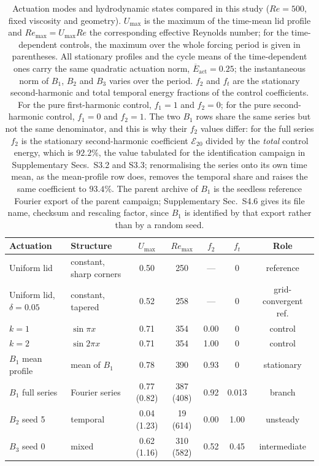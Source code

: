 \documentclass[11pt,a4paper]{article}
\newenvironment{chgadd}{\par\color{blue}}{\par\color{black}}
\begin{document}
\begin{chgadd}
\begin{table}[t]
\centering
\caption{Actuation modes and hydrodynamic states compared in this study
($Re=500$, fixed viscosity and geometry). $U_{\max}$ is the maximum of the
time-mean lid profile and $Re_{\max}=U_{\max}Re$ the corresponding effective
Reynolds number; for the time-dependent controls, the maximum over the whole
forcing period is given in parentheses. All stationary profiles and the cycle means of
the time-dependent ones carry the same quadratic actuation norm,
$\overline{E}_{\mathrm{act}}=0.25$; the instantaneous norm of $B_1$, $B_2$ and $B_3$
varies over the period. $f_2$ and $f_t$ are the stationary second-harmonic and
total temporal energy fractions of the control coefficients. For the pure
first-harmonic control, $f_1=1$ and $f_2=0$; for the pure second-harmonic control,
$f_1=0$ and $f_2=1$. The two $B_1$ rows share the same series but not the same
denominator, and this is why their $f_2$ values differ: for the full series $f_2$ is
the stationary second-harmonic coefficient $\mathcal{E}_{20}$ divided by the
\emph{total} control energy, which is $92.2\%$, the value tabulated for the
identification campaign in Supplementary Secs.~S3.2 and S3.3; renormalising the
series onto its own time mean, as the mean-profile row does, removes the temporal
share and raises the same coefficient to $93.4\%$. The parent archive of $B_1$ is
the seedless reference Fourier export of the parent campaign; Supplementary
Sec.~S4.6 gives its file name, checksum and rescaling factor, since $B_1$ is
identified by that export rather than by a random seed.}
\label{tab:modes}
\footnotesize
\setlength{\tabcolsep}{4pt}
\begin{tabular}{llccccc}
\toprule
Actuation & Structure & $U_{\max}$ & $Re_{\max}$ & $f_2$ & $f_t$ & Role\\
\midrule
Uniform lid & constant, sharp corners & 0.50 & 250 & --- & 0 & reference\\
Uniform lid, $\delta=0.05$ & constant, tapered & 0.52 & 258 & --- & 0 & grid-convergent ref.\\
$k=1$ & $\sin\pi x$ & 0.71 & 354 & 0.00 & 0 & control\\
$k=2$ & $\sin 2\pi x$ & 0.71 & 354 & 1.00 & 0 & control\\
$B_1$ mean profile & mean of $B_1$ & 0.78 & 390 & 0.93 & 0 & stationary\\
$B_1$ full series & Fourier series & 0.77 (0.82) & 387 (408) & 0.92 & 0.013 & branch\\
$B_2$ seed 5 & temporal & 0.04 (1.23) & 19 (614) & 0.00 & 1.00 & unsteady\\
$B_3$ seed 0 & mixed & 0.62 (1.16) & 310 (582) & 0.52 & 0.45 & intermediate\\
\bottomrule
\end{tabular}
\end{table}
\end{chgadd}
\end{document}
